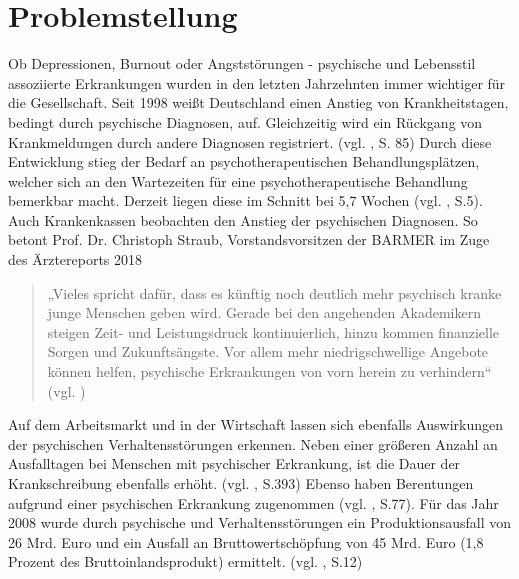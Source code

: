 
\section{Problemstellung}
\label{ch:Problemstellung}


Ob Depressionen, Burnout oder Angststörungen - psychische und Lebensstil assoziierte Erkrankungen wurden in den letzten Jahrzehnten immer wichtiger für die Gesellschaft. Seit 1998 weißt Deutschland einen Anstieg von Krankheitstagen, bedingt durch psychische Diagnosen, auf. Gleichzeitig wird ein Rückgang von Krankmeldungen durch andere Diagnosen registriert. (vgl. \cite{Jacobi2014}, S. 85) Durch diese Entwicklung stieg der Bedarf an psychotherapeutischen Behandlungsplätzen, welcher sich an den Wartezeiten für eine psychotherapeutische Behandlung bemerkbar macht. Derzeit liegen diese im Schnitt bei 5,7 Wochen (vgl. \cite{Microsof77:online}, S.5). Auch Krankenkassen beobachten den Anstieg der psychischen Diagnosen. So betont Prof. Dr. Christoph Straub, Vorstandsvorsitzen der BARMER im Zuge des Ärztereports 2018 
\begin{quote}
„Vieles spricht dafür, dass es künftig noch deutlich mehr psychisch kranke junge Menschen geben wird. Gerade bei den angehenden Akademikern steigen Zeit- und Leistungsdruck kontinuierlich, hinzu kommen finanzielle Sorgen und Zukunftsängste. Vor allem mehr niedrigschwellige Angebote können helfen, psychische Erkrankungen von vorn herein zu verhindern“ (vgl. \cite{Arztrepo90:online})
\end{quote}
Auf dem Arbeitsmarkt und in der Wirtschaft lassen sich ebenfalls Auswirkungen der psychischen Verhaltensstörungen erkennen. Neben einer größeren Anzahl an Ausfalltagen bei Menschen mit psychischer Erkrankung, ist die Dauer der Krankschreibung ebenfalls erhöht. (vgl. \cite{Nubling2014}, S.393) Ebenso haben Berentungen aufgrund einer psychischen Erkrankung zugenommen (vgl. \cite{Jacobi2014} \cite{Nubling2014}, S.77). Für das Jahr 2008 wurde durch psychische und Verhaltensstörungen ein Produktionsausfall von 26 Mrd. Euro und ein Ausfall an Bruttowertschöpfung von 45 Mrd. Euro (1,8 Prozent des Bruttoinlandsprodukt) ermittelt. (vgl. \cite{bundesregierungdeutschland2012}, S.12)

